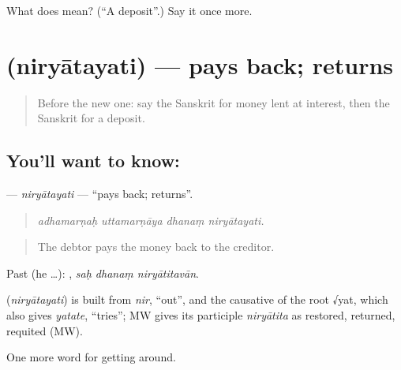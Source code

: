 \begin{tcolorbox}[breakable,colback=teal!4,colframe=teal!35!black,title={Before you move on}]
What does  mean? (\textquotedblleft{}A deposit\textquotedblright{}.) Say it once more.
\end{tcolorbox}
\section[\texorpdfstring{\sk{निर्यातयति} (niryātayati)}{निर्यातयति (niryātayati)}]{ (niryātayati) — pays back; returns}

\label{lesson:SA-C434-niryatayati}



\begin{quote}
Before the new one: say the Sanskrit for money lent at interest, then the Sanskrit for a deposit.
\end{quote}

\subsection*{You'll want to know: }
\textbf{} — \emph{niryātayati} — \textquotedblleft{}pays back; returns\textquotedblright{}.

\begin{quote}
   
\end{quote}

\begin{quote}
\emph{adhamarṇaḥ uttamarṇāya dhanaṃ niryātayati.}
\end{quote}

\begin{quote}
The debtor pays the money back to the creditor.
\end{quote}

Past (he …):   , \emph{saḥ dhanaṃ niryātitavān}.

\begin{cousinweb}
\textbf{} (\emph{niryātayati}) is built from \emph{nir}, \textquotedblleft{}out\textquotedblright{}, and the causative of the root √yat, which also gives \emph{yatate}, \textquotedblleft{}tries\textquotedblright{}; MW gives its participle \emph{niryātita} as restored, returned, requited (MW).
\end{cousinweb}

\begin{grammarlens}[title={What you've built}]
One more word for getting around.
\end{grammarlens}

